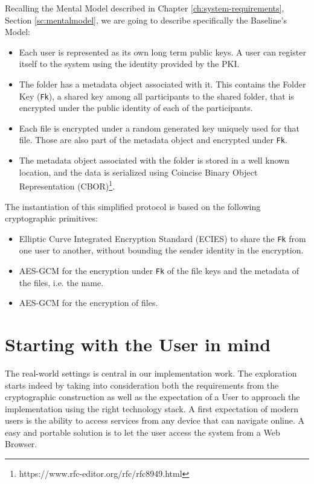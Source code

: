 Recalling the Mental Model described in Chapter \cref{ch:system-requirements}, Section \cref{sc:mentalmodel}, 
we are going to describe specifically the Baseline's Model:
\begin{itemize}
    \item Each user is represented as its own long term public keys. A user can register itself to the system using the identity provided by the PKI.
    \item The folder has a metadata object associated with it. This contains the Folder Key (\texttt{Fk}), a shared key among all participants to the shared folder, that is encrypted under the public identity of each of the participants.
    \item Each file is encrypted under a random generated key uniquely used for that file. Those are also part of the metadata object and encrypted under \texttt{Fk}.
    \item The metadata object associated with the folder is stored in a well known location, and the data is serialized using Coincise Binary Object Representation (CBOR)\footnote{https://www.rfc-editor.org/rfc/rfc8949.html}.
\end{itemize}

The instantiation of this simplified protocol is based on the following cryptographic primitives:
\begin{itemize}
    \item Elliptic Curve Integrated Encryption Standard (ECIES) to share the \texttt{Fk} from one user to another, without bounding the sender identity in the encryption.
    \item AES-GCM for the encryption under \texttt{Fk} of the file keys and the metadata of the files, i.e. the name.
    \item AES-GCM for the encryption of files. 
\end{itemize}

\section{Starting with the User in mind} \label{sc:starting-with-the-user}

The real-world settings is central in our implementation work. 
The exploration starts indeed by taking into consideration both the requirements from the cryptographic construction as well as the expectation of a User to approach the implementation using the right technology stack.
A first expectation of modern users is the ability to access services from any device that can navigate online.
A easy and portable solution is to let the user access the system from a Web Browser.

